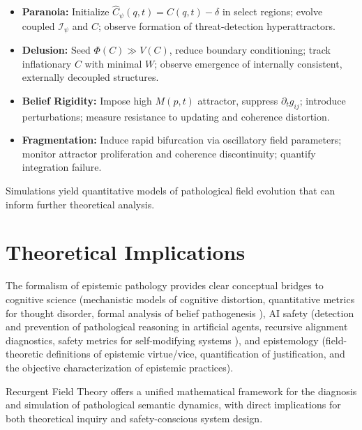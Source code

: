 \begin{itemize}

    \item \textbf{Paranoia:} Initialize \(\hat{C}_{\psi}(q,t) = C(q,t) - \delta\) in select regions; evolve coupled \(\mathcal{I}_{\psi}\) and \(C\); observe formation of threat-detection hyperattractors.
    
    \item \textbf{Delusion:} Seed \(\Phi(C) \gg V(C)\), reduce boundary conditioning; track inflationary \(C\) with minimal \(W\); observe emergence of internally consistent, externally decoupled structures.
    
    \item \textbf{Belief Rigidity:} Impose high \(M(p,t)\) attractor, suppress \(\partial_t g_{ij}\); introduce perturbations; measure resistance to updating and coherence distortion.
    
    \item \textbf{Fragmentation:} Induce rapid bifurcation via oscillatory field parameters; monitor attractor proliferation and coherence discontinuity; quantify integration failure.

\end{itemize}

Simulations yield quantitative models of pathological field evolution that can inform further theoretical analysis.


\section{Theoretical Implications}
\label{16.6:theoretical_implications}

The formalism of epistemic pathology provides clear conceptual bridges to cognitive science (mechanistic models of cognitive distortion, quantitative metrics for thought disorder, formal analysis of belief pathogenesis \autocite{Crick1990, Dehaene2014}), AI safety (detection and prevention of pathological reasoning in artificial agents, recursive alignment diagnostics, safety metrics for self-modifying systems \autocite{RussellDeweyTegmark2016}), and epistemology (field-theoretic definitions of epistemic virtue/vice, quantification of justification, and the objective characterization of epistemic practices).

Recurgent Field Theory offers a unified mathematical framework for the diagnosis and simulation of pathological semantic dynamics, with direct implications for both theoretical inquiry and safety-conscious system design. 